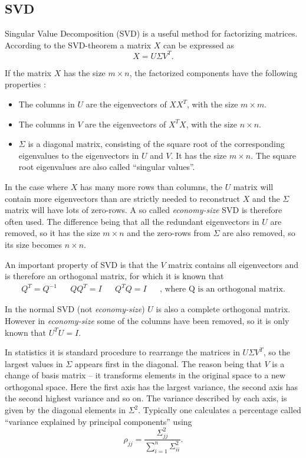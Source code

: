 \subsection{SVD}
Singular Value Decomposition (SVD) is a useful method for factorizing matrices.
 According to the SVD-theorem a matrix $X$  can be expressed as
\begin{equation}
X=U \Sigma V^{T}.
\label{eq:theory-svd}
\end{equation}

If the matrix $X$ has the size $m \times n$, the factorized components have the following properties \cite{introduction-to-data-mining}:
\begin{itemize}
\item The columns in $U$ are the eigenvectors of $X X^T$, with the size $m \times m$.
\item The columns in $V$ are the eigenvectors of $X^T X$, with the size $n \times n$.
\item $\Sigma$ is a diagonal matrix, consisting of the square root of the corresponding eigenvalues to the eigenvectors in $U$ and $V$.
It has the size $m \times n$. The square root eigenvalues are also called ``singular values''.
\end{itemize}

In the case where $X$ has many more rows than columns, the $U$ matrix will contain more eigenvectors than are strictly needed to reconstruct $X$ and the $\Sigma$ matrix will have lots of zero-rows.
A so called \textit{economy-size} SVD is therefore often used.
The difference being that all the redundant eigenvectors in $U$ are removed, so it has the size $m \times n$ and the zero-rows from $\Sigma$ are also removed, so its size becomes $n \times n$.

An important property of SVD is that the $V$ matrix contains all eigenvectors and is therefore an orthogonal matrix, for which it is known that
\begin{align}
Q^T = Q^{-1} && Q Q^T = I && Q^T Q = I && \text{, where Q is an orthogonal matrix.}
\end{align}

In the normal SVD (not \textit{economy-size}) $U$ is also a complete orthogonal matrix.
However in \textit{economy-size} some of the columns have been removed, so it is only known that $U^T U = I$.

In statistics it is standard procedure to rearrange the matrices in $U \Sigma V^T$, so the largest values in $\Sigma$ appears first in the diagonal.
The reason being that $V$ is a change of basis matrix -- it transforms elements in the original space to a new orthogonal space.
Here the first axis has the largest variance, the second axis has the second highest variance and so on.
The variance described by each axis, is given by the diagonal elements in $\Sigma^2$.
Typically one calculates a percentage called ``variance explained by principal components'' using
\begin{equation}
\rho_{jj} = \frac{\Sigma^2_{jj}}{\sum_{i=1}^n \Sigma^2_{ii}}.
\end{equation}

